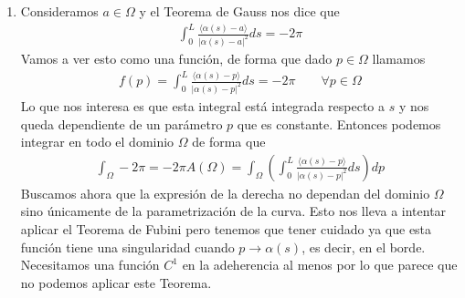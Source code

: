 \begin{observacion}
\begin{enumerate}[start=4]
        \item Consideramos $a\in \Omega$ y el Teorema de Gauss nos dice que 
        \begin{gather*}
            \int_0^L \frac{\langle \alpha(s) - a \rangle}{|\alpha(s)-a|^2} ds = -2\pi
        \end{gather*}
        Vamos a ver esto como una función, de forma que dado $p\in \Omega$ llamamos 
        \begin{gather*}
            f(p) = \int_0^L \frac{\langle \alpha(s) - p \rangle}{|\alpha(s)-p|^2} ds = -2\pi \qquad \forall p\in \Omega
        \end{gather*}
        Lo que nos interesa es que esta integral está integrada respecto a $s$ y nos queda dependiente de un parámetro $p$ que es constante. Entonces podemos integrar en todo el dominio $\Omega$ de forma que 
        \begin{gather*}
            \int_\Omega -2\pi = -2\pi A(\Omega) = \int_\Omega \left( \int_0^L \frac{\langle \alpha(s) - p \rangle}{|\alpha(s)-p|^2} ds \right) dp 
        \end{gather*}
        Buscamos ahora que la expresión de la derecha no dependan del dominio $\Omega$ sino únicamente de la parametrización de la curva. Esto nos lleva a intentar aplicar el Teorema de Fubini pero tenemos que tener cuidado ya que esta función tiene una singularidad cuando $p \to \alpha(s)$, es decir, en el borde. Necesitamos una función $C^1$ en la adeherencia al menos por lo que parece que no podemos aplicar este Teorema. \\
        

\end{enumerate}
\end{observacion}
